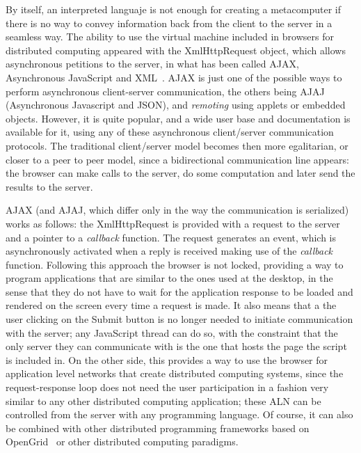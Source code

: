 \documentclass{llncs}
\begin{document}
By itself, an interpreted languaje is not enough for creating a
metacomputer if there is no way to convey information back from the
client to the server in a seamless way. The ability to use the virtual
machine included in browsers for distributed computing appeared with
the {\sf XmlHttpRequest} object, which allows asynchronous petitions to the
server, in what has been called AJAX, Asynchronous JavaScript and
XML~\cite{wiki:AJAX}. AJAX is just one of the possible ways to
perform asynchronous client-server communication, the others being
AJAJ (Asynchronous Javascript and JSON), and {\em remoting} using
applets or embedded objects. However, it is quite popular, and a wide
user base and documentation is available for it, using any of these
asynchronous client/server communication protocols. The traditional client/server model becomes then
more egalitarian, or closer to a peer to peer model, since a
bidirectional communication line appears: the browser can make calls to the
server, do some computation and later send the results to the server.

AJAX (and AJAJ, which differ only in the way the communication is
serialized) works as follows: the {\sf XmlHttpRequest} is provided 
with a request to the server and a pointer to a {\em callback} function. 
The request generates an event, which is asynchronously activated when a
reply is received  making use of the
 {\em callback} function. 
Following this approach the browser is not locked, providing a way to
program applications that are similar to  the ones used at the
desktop, in the sense that they do not have to wait for the
application response to be loaded
and rendered on the screen every time a request is made. It also means
that a the user clicking on the {\sf Submit} button is no longer
needed to initiate communication with the server; any JavaScript
thread can do so, with the constraint that the only server they can
communicate with is the one that hosts the page the script is included
in. On the other side, this provides a way to use the browser for application
level networks that create distributed computing systems,
since the request-response loop does not need the user participation in a
fashion very similar  to any other distributed computing application;
these ALN can be controlled from the server with any programming
language. Of course, it can also be combined with other distributed
programming frameworks based on OpenGrid~\cite{ogsa} or other
distributed computing paradigms. %
\end{document}
